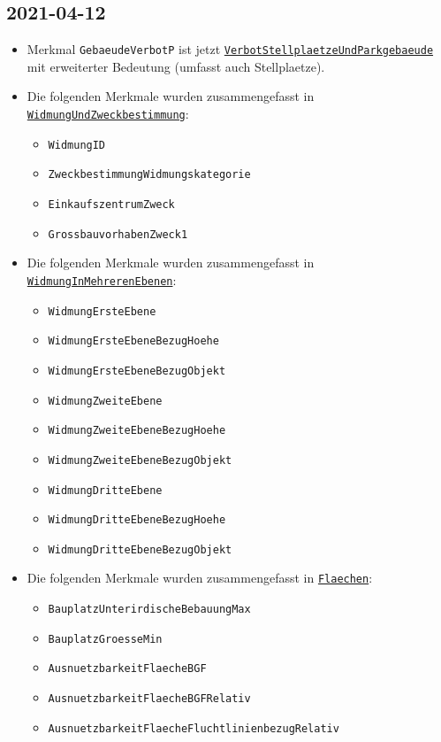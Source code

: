 \documentclass{article}
\newcommand{\mml}[1]{\texttt{#1}}
\newcommand{\merkmalref}[1]{\hyperref[merkmal:#1]{\mml{#1}}}
\begin{document}
\subsection{2021-04-12}
\label{changes:2021-04-12}
\begin{itemize}
  \item Merkmal \mml{GebaeudeVerbotP} ist jetzt
    \merkmalref{VerbotStellplaetzeUndParkgebaeude} mit erweiterter
    Bedeutung (umfasst auch Stellplaetze).
  \item Die folgenden Merkmale wurden zusammengefasst in
    \merkmalref{WidmungUndZweckbestimmung}:
    \begin{itemize}
    \item \mml{WidmungID}
    \item \mml{ZweckbestimmungWidmungskategorie}
    \item \mml{EinkaufszentrumZweck}
    \item \mml{GrossbauvorhabenZweck1}
    \end{itemize}
  \item Die folgenden Merkmale wurden zusammengefasst in
    \merkmalref{WidmungInMehrerenEbenen}:
    \begin{itemize}
    \item \mml{WidmungErsteEbene}
    \item \mml{WidmungErsteEbeneBezugHoehe}
    \item \mml{WidmungErsteEbeneBezugObjekt}
    \item \mml{WidmungZweiteEbene}
    \item \mml{WidmungZweiteEbeneBezugHoehe}
    \item \mml{WidmungZweiteEbeneBezugObjekt}
    \item \mml{WidmungDritteEbene}
    \item \mml{WidmungDritteEbeneBezugHoehe}
    \item \mml{WidmungDritteEbeneBezugObjekt}
    \end{itemize}
  \item Die folgenden Merkmale wurden zusammengefasst in \merkmalref{Flaechen}:
    \begin{itemize}
    \item \mml{BauplatzUnterirdischeBebauungMax}
    \item \mml{BauplatzGroesseMin}
    \item \mml{AusnuetzbarkeitFlaecheBGF}
    \item \mml{AusnuetzbarkeitFlaecheBGFRelativ}
    \item \mml{AusnuetzbarkeitFlaecheFluchtlinienbezugRelativ}

\end{itemize}
\end{itemize}
\end{document}
